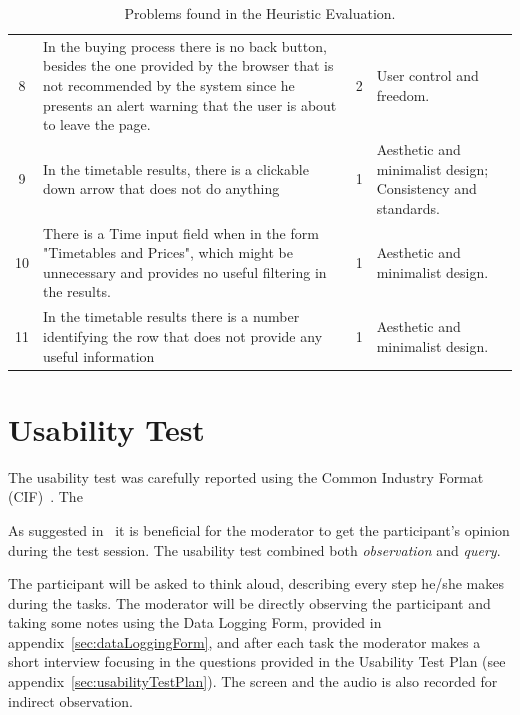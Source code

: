\documentclass[a4paper]{article}
\begin{document}
\begin{table}[h]
\begin{center}
\begin{tabular}{c | p{8cm} | c | p{4.5cm}}
8 & In the buying process there is no back button, besides the one provided by the browser that is not recommended by the system since he presents an alert warning that the user is about to leave the page. & \cellcolor{orange!20}2 & User control and freedom.\\

9  &  In the timetable results, there is a clickable down arrow that does not do anything  & \cellcolor{yellow!10} 1 &  Aesthetic and minimalist design; Consistency and standards.  \\

	10  &  There is a Time input field when in the form "Timetables and Prices", which might be unnecessary and provides no useful filtering in the results.  & \cellcolor{yellow!10} 1 &  Aesthetic and minimalist design.  \\
	
		11 &  In the timetable results there is a number identifying the row that does not provide any useful information & \cellcolor{yellow!10} 1 & Aesthetic and minimalist design.\\
	
\hline
\end{tabular}
\end{center}
\caption{Problems found in the Heuristic Evaluation.}
\label{tab:heuristic_results}
\end{table}


\section{Usability Test}

The usability test was carefully reported using the Common Industry Format (CIF)~\citep{iusr2006cif}. The 


As suggested in~\citep{mitchell2007step} it is beneficial for the moderator to get the participant's opinion during the test session.
The usability test combined both \emph{observation} and \textit{query}.

 The participant will be asked to think aloud, describing every step he/she makes during the tasks. The moderator will be directly observing the participant and taking some notes using the Data Logging Form, provided in appendix~\ref{sec:dataLoggingForm}, and after each task the moderator makes a short interview focusing in the questions provided in the Usability Test Plan (see appendix~\ref{sec:usabilityTestPlan}). The screen and the audio is also recorded for indirect observation.
\end{document}
